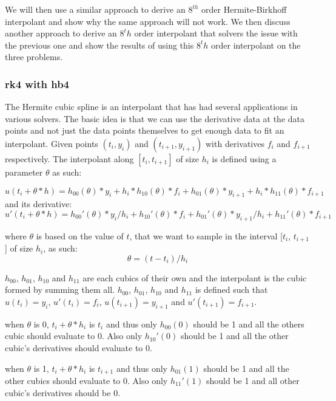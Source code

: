\documentclass{article}
\begin{document}
We will then use a similar approach to derive an $8^{th}$ order Hermite-Birkhoff interpolant and show why the same approach will not work. We then discuss another approach to derive an $8^th$ order interpolant that solvers the issue with the previous one and show the results of using this $8^th$ order interpolant on the three problems.


\subsubsection{rk4 with hb4}
The Hermite cubic spline is an interpolant that has had several applications in various solvers. The basic idea is that we can use the derivative data at the data points and not just the data points themselves to get enough data to fit an interpolant. Given points $(t_i, y_i)$ and $(t_{i + 1}, y_{i + 1})$ with derivatives $f_i$ and $f_{i + 1}$ respectively. The interpolant along $[t_i, t_{i + 1}]$ of size $h_i$ is defined using a parameter $\theta$ as such:

\begin{equation}
u(t_i + \theta*h) = h_{00}(\theta)*y_i +  h_i*h_{10}(\theta)*f_i + h_{01}(\theta)*y_{i + 1} + h_i*h_{11}(\theta)*f_{i + 1} 
\end{equation}
and its derivative:
\begin{equation}
u'(t_i + \theta*h) = h_{00}'(\theta)*y_i/h_i +  h_{10}'(\theta)*f_i + h_{01}'(\theta)*y_{i + 1}/h_i + h_{11}'(\theta)*f_{i + 1} 
\end{equation}

where $\theta$ is based on the value of $t$, that we want to sample in the interval [$t_i$, $t_{i + 1}$] of size $h_i$, as such:
\begin{equation}
\theta = (t - t_i) / h_i
\end{equation}

$h_{00}$, $h_{01}$, $h_{10}$ and $h_{11}$ are each cubics of their own and the interpolant is the cubic formed by summing them all. $h_{00}$, $h_{01}$, $h_{10}$ and $h_{11}$ is defined such that $u(t_i)= y_i$, $u'(t_i) = f_i$, $u(t_{i+1}) = y_{i + 1}$ and $u'(t_{i + 1}) = f_{i + 1}$.

when $\theta$ is 0, $t_i + \theta*h_i$ is $t_i$ and thus only $h_{00}(0)$ should be 1 and all the others cubic should evaluate to 0. Also only $h_{10}'(0)$ should be 1 and all the other cubic's derivatives should evaluate to 0.

when $\theta$ is 1, $t_i + \theta*h_i$ is $t_{i + 1}$ and thus only $h_{01}(1)$ should be 1 and all the other cubics should evaluate to 0. Also only $h_{11}'(1)$ should be 1 and all other cubic's  derivatives should be 0.
\end{document}
